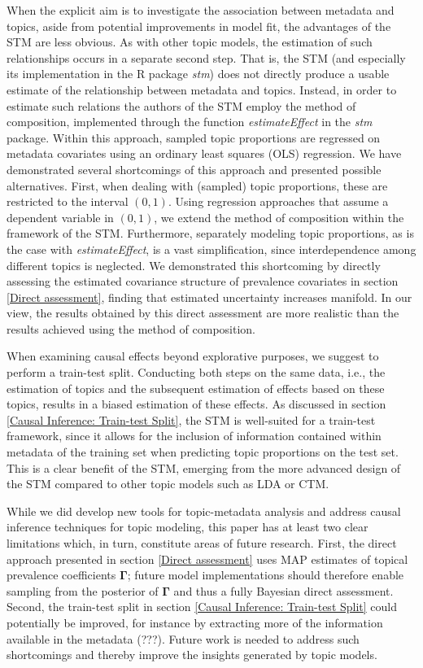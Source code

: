 When the explicit aim is to investigate the association between metadata and topics, aside from potential improvements in model fit, the advantages of the STM are less obvious. As with other topic models, the estimation of such relationships occurs in a separate second step. That is, the STM (and especially its implementation in the R package \textit{stm}) does not directly produce a usable estimate of the relationship between metadata and topics. Instead, in order to estimate such relations the authors of the STM employ the method of composition, implemented through the function \textit{estimateEffect} in the \textit{stm} package. Within this approach, sampled topic proportions are regressed on metadata covariates using an ordinary least squares (OLS) regression. We have demonstrated several shortcomings of this approach and presented possible alternatives. First, when dealing with (sampled) topic proportions, these are restricted to the interval $(0,1)$. Using regression approaches that assume a dependent variable in $(0,1)$, we extend the method of composition within the framework of the STM. Furthermore, separately modeling topic proportions, as is the case with \textit{estimateEffect}, is a vast simplification, since interdependence among different topics is neglected. We demonstrated this shortcoming by directly assessing the estimated covariance structure of prevalence covariates in section \ref{Direct assessment}, finding that estimated uncertainty increases manifold. In our view, the results obtained by this direct assessment are more realistic than the results achieved using the method of composition. 

When examining causal effects beyond explorative purposes, we suggest to perform a train-test split. Conducting both steps on the same data, i.e., the estimation of topics and the subsequent estimation of effects based on these topics, results in a biased estimation of these effects. As discussed in section \ref{Causal Inference: Train-test Split}, the STM is well-suited for a train-test framework, since it allows for the inclusion of information contained within metadata of the training set when predicting topic proportions on the test set. This is a clear benefit of the STM, emerging from the more advanced design of the STM compared to other topic models such as LDA or CTM.

While we did develop new tools for topic-metadata analysis and address causal inference techniques for topic modeling, this paper has at least two clear limitations which, in turn, constitute areas of future research. First, the direct approach presented in section \ref{Direct assessment} uses MAP estimates of topical prevalence coefficients $\boldsymbol{\Gamma}$; future model implementations should therefore enable sampling from the posterior of $\boldsymbol{\Gamma}$ and thus a fully Bayesian direct assessment. Second, the train-test split in section \ref{Causal Inference: Train-test Split} could potentially be improved, for instance by extracting more of the information available in the metadata (???). Future work is needed to address such shortcomings and thereby improve the insights generated by topic models.
